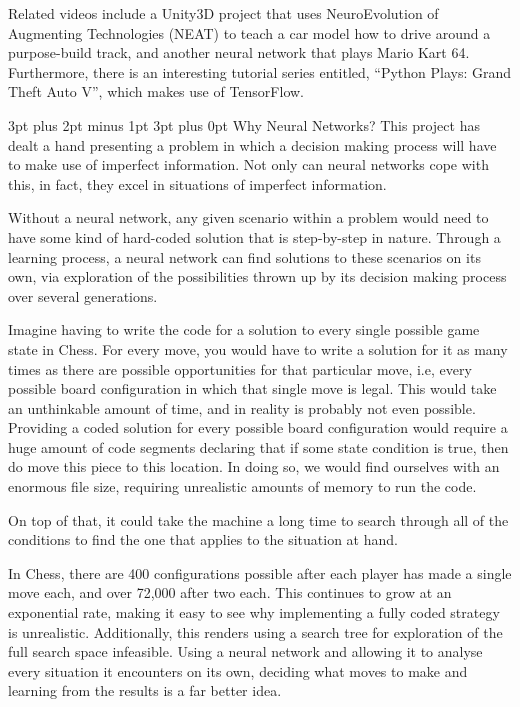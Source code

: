 \documentclass[12pt,a4paper]{article}
\makeatletter
\renewcommand\subsection{\@startsection {subsection}{1}{2mm} %
                               {3pt plus 2pt minus 1pt} %
                               {3pt plus 0pt} %
                               {\normalfont\bfseries}}
\makeatother
\begin{document}
Related videos include a Unity3D project that uses NeuroEvolution of Augmenting Technologies (NEAT) to teach a car model how to drive around a purpose-build track\citep{26}, and another neural network that plays Mario Kart 64\citep{27}. Furthermore, there is an interesting tutorial series entitled, \enquote{Python Plays: Grand Theft Auto V}\citep{28}, which makes use of TensorFlow\citep{17}.

\subsection{Why Neural Networks?}
This project has dealt a hand presenting a problem in which a decision making process will have to make use of imperfect information. Not only can neural networks cope with this, in fact, they excel in situations of imperfect information.

Without a neural network, any given scenario within a problem would need to have some kind of hard-coded solution that is step-by-step in nature. Through a learning process, a neural network can find solutions to these scenarios on its own, via exploration of the possibilities thrown up by its decision making process over several generations. 

Imagine having to write the code for a solution to every single possible game state in Chess. For every move, you would have to write a solution for it as many times as there are possible opportunities for that particular move, i.e, every possible board configuration in which that single move is legal. This would take an unthinkable amount of time, and in reality is probably not even possible. Providing a coded solution for every possible board configuration would require a huge amount of code segments declaring that if some state condition is true, then do move this piece to this location. In doing so, we would find ourselves with an enormous file size, requiring unrealistic amounts of memory to run the code. 

On top of that, it could take the machine a long time to search through all of the conditions to find the one that applies to the situation at hand. 

In Chess, there are 400 configurations possible after each player has made a single move each, and over 72,000 after two each\citep{20}. This continues to grow at an exponential rate, making it easy to see why implementing a fully coded strategy is unrealistic. Additionally, this renders using a search tree for exploration of the full search space infeasible\citep{29}. Using a neural network and allowing it to analyse every situation it encounters on its own, deciding what moves to make and learning from the results is a far better idea. 
\end{document}

